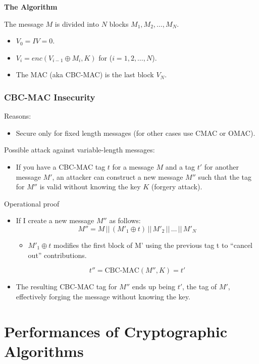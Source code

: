 \begin{center}
    \textbf{The Algorithm}
\end{center}
The message $M$ is divided into $N$ blocks $M_1, M_2, \dots, M_N$.
\begin{itemize}
    \item $V_0 = IV = 0$.
    \item $V_i = enc(V_{i-1} \oplus M_i, K)$ \quad \quad for ($i=1,2,\dots,N$).
    \item The MAC (aka CBC-MAC) is the last block $V_N$.
\end{itemize}

\subsubsection*{CBC-MAC Insecurity}
Reasons:
\begin{itemize}
    \item Secure only for fixed length messages (for other cases use CMAC or OMAC).
\end{itemize}
Possible attack against variable-length messages:
    \begin{itemize}
        \item If you have a CBC-MAC tag $t$ for a message $M$ and a tag $t'$ for another message $M'$, an attacker can construct a new message $M''$ such that the tag for $M''$ is valid without knowing the key $K$ (forgery attack).
        
\end{itemize}
\begin{center}
    Operational proof
\end{center}
    \begin{itemize}
        \item If I create a new message $M''$ as follows:
        \[
            M'' = M \, || \, (M'_1 \oplus t) \, || \, M'_2 \, || \, \dots \, || \, M'_N
        \]
        \begin{itemize}
            \item $M'_1 \oplus t$ modifies the first block of M' using the previous tag t to “cancel out” contributions.
        \end{itemize} 
        \[
            t'' = \text{CBC-MAC}(M'', K) = t'
        \]
        \item The resulting CBC-MAC tag for $M''$ ends up being $t'$, the tag of $M'$, effectively forging the message without knowing the key.
    \end{itemize}

\section*{Performances of Cryptographic Algorithms}

